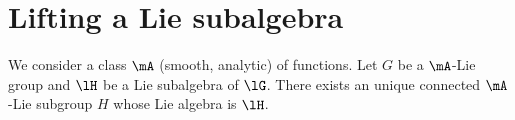 \section{Lifting a Lie subalgebra}

\begin{theorem}       \label{THOooXALIooGiPVdD}
    We consider a class \( \mA\) (smooth, analytic) of functions. Let \( G\) be a \( \mA\)-Lie group and \( \lH\) be a Lie subalgebra of \( \lG\). There exists an unique connected \( \mA\)-Lie subgroup \( H\) whose Lie algebra is \( \lH\).
\end{theorem}

